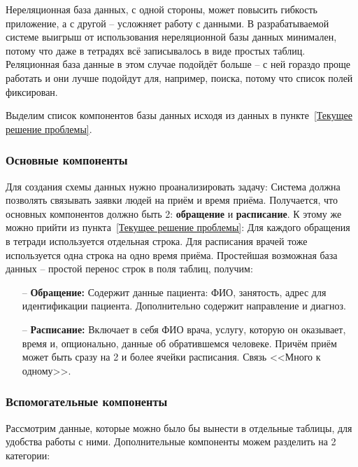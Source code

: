 \documentclass[a4paper,article]{article}
\begin{document}
    Нереляционная база данных, с одной стороны, может повысить гибкость приложение, а с другой -- усложняет работу с данными. В разрабатываемой системе выигрыш от использования нереляционной базы данных минимален, потому что даже в тетрадях всё записывалось в виде простых таблиц. Реляционная база данные в этом случае подойдёт больше -- с ней гораздо проще работать и они лучше подойдут для, например, поиска, потому что список полей фиксирован.

    Выделим список компонентов базы данных исходя из данных в пункте~\ref{Текущее решение проблемы}.

    \subsubsection{Основные компоненты}\label{Проектирование БД. Основные компоненты}

    Для создания схемы данных нужно проанализировать задачу: Система должна позволять связывать заявки людей на приём и время приёма. Получается, что основных компонентов должно быть 2: \textbf{обращение} и \textbf{расписание}. К этому же можно прийти из пункта~\ref{Текущее решение проблемы}: Для каждого обращения в тетради используется отдельная строка. Для расписания врачей тоже используется одна строка на одно время приёма. Простейшая возможная база данных -- простой перенос строк в поля таблиц, получим:

    \begin{itemize}[nolistsep]
        \item[--] \textbf{Обращение:} Содержит данные пациента: ФИО, занятость, адрес для идентификации пациента. Дополнительно содержит направление и диагноз.
        \item[--] \textbf{Расписание:} Включает в себя ФИО врача, услугу, которую он оказывает, время и, опционально, данные об обратившемся человеке. Причём приём может быть сразу на 2 и более ячейки расписания. Связь <<Много к одному>>.
    \end{itemize}

    \subsubsection{Вспомогательные компоненты}\label{Проектирование БД. Вспомогательные компоненты}

    Рассмотрим данные, которые можно было бы вынести в отдельные таблицы, для удобства работы с ними. Дополнительные компоненты можем разделить на 2 категории:
\end{document}
